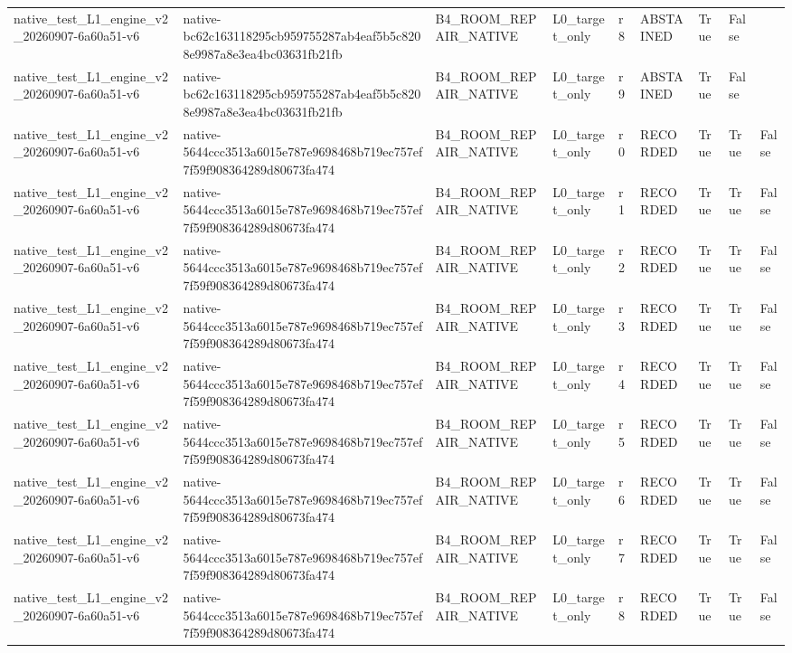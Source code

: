 \begin{tabular}{lllllllll}
native\_test\_L1\_engine\_v2\_20260907-6a60a51-v6 & native-bc62c163118295cb959755287ab4eaf5b5c8208e9987a8e3ea4bc03631fb21fb & B4\_ROOM\_REPAIR\_NATIVE & L0\_target\_only & r8 & ABSTAINED & True & False &  \\
native\_test\_L1\_engine\_v2\_20260907-6a60a51-v6 & native-bc62c163118295cb959755287ab4eaf5b5c8208e9987a8e3ea4bc03631fb21fb & B4\_ROOM\_REPAIR\_NATIVE & L0\_target\_only & r9 & ABSTAINED & True & False &  \\
native\_test\_L1\_engine\_v2\_20260907-6a60a51-v6 & native-5644ccc3513a6015e787e9698468b719ec757ef7f59f908364289d80673fa474 & B4\_ROOM\_REPAIR\_NATIVE & L0\_target\_only & r0 & RECORDED & True & True & False \\
native\_test\_L1\_engine\_v2\_20260907-6a60a51-v6 & native-5644ccc3513a6015e787e9698468b719ec757ef7f59f908364289d80673fa474 & B4\_ROOM\_REPAIR\_NATIVE & L0\_target\_only & r1 & RECORDED & True & True & False \\
native\_test\_L1\_engine\_v2\_20260907-6a60a51-v6 & native-5644ccc3513a6015e787e9698468b719ec757ef7f59f908364289d80673fa474 & B4\_ROOM\_REPAIR\_NATIVE & L0\_target\_only & r2 & RECORDED & True & True & False \\
native\_test\_L1\_engine\_v2\_20260907-6a60a51-v6 & native-5644ccc3513a6015e787e9698468b719ec757ef7f59f908364289d80673fa474 & B4\_ROOM\_REPAIR\_NATIVE & L0\_target\_only & r3 & RECORDED & True & True & False \\
native\_test\_L1\_engine\_v2\_20260907-6a60a51-v6 & native-5644ccc3513a6015e787e9698468b719ec757ef7f59f908364289d80673fa474 & B4\_ROOM\_REPAIR\_NATIVE & L0\_target\_only & r4 & RECORDED & True & True & False \\
native\_test\_L1\_engine\_v2\_20260907-6a60a51-v6 & native-5644ccc3513a6015e787e9698468b719ec757ef7f59f908364289d80673fa474 & B4\_ROOM\_REPAIR\_NATIVE & L0\_target\_only & r5 & RECORDED & True & True & False \\
native\_test\_L1\_engine\_v2\_20260907-6a60a51-v6 & native-5644ccc3513a6015e787e9698468b719ec757ef7f59f908364289d80673fa474 & B4\_ROOM\_REPAIR\_NATIVE & L0\_target\_only & r6 & RECORDED & True & True & False \\
native\_test\_L1\_engine\_v2\_20260907-6a60a51-v6 & native-5644ccc3513a6015e787e9698468b719ec757ef7f59f908364289d80673fa474 & B4\_ROOM\_REPAIR\_NATIVE & L0\_target\_only & r7 & RECORDED & True & True & False \\
native\_test\_L1\_engine\_v2\_20260907-6a60a51-v6 & native-5644ccc3513a6015e787e9698468b719ec757ef7f59f908364289d80673fa474 & B4\_ROOM\_REPAIR\_NATIVE & L0\_target\_only & r8 & RECORDED & True & True & False \\

\end{tabular}
